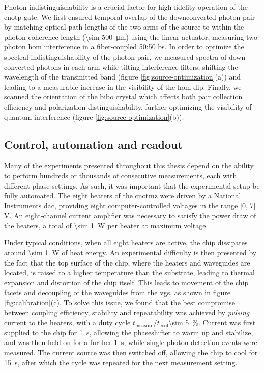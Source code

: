 Photon indistinguishability is a crucial factor for high-fidelity operation of the \gls{cnotp} gate. We first ensured temporal overlap of the downconverted photon pair by matching optical path lengths of the two arms of the source to within the photon coherence length (\SI{\sim 500}{\micro\metre}) using the linear actuator, measuring two-photon \gls{hom} interference in a fiber-coupled 50:50 \gls{bs}.  In order to optimize the spectral indistinguishability of the photon pair, we measured spectra of down-converted photons in each arm while tilting interference filters, shifting the wavelength of the transmitted band (figure \ref{fig:source-optimization}(a)) and leading to a measurable increase in the visibility of the \gls{hom} dip. Finally, we scanned the orientation of the \gls{bibo} crystal which affects both pair collection efficiency and polarization distinguishability, further optimizing the visibility of quantum interference (figure \ref{fig:source-optimization}(b)).

\subsection{Control, automation and readout} 
\label{sec:control-automation-readout}
Many of the experiments presented throughout this thesis depend on the ability to perform hundreds or thousands of consecutive measurements, each with different phase settings. As such, it was important that the experimental setup be fully automated.  The eight heaters of the \gls{cnotmz} were driven by a National Instruments \gls{dac}, providing eight computer-controlled voltages in the range [0, 7] \si{\volt}. An eight-channel current amplifier was necessary to satisfy the power draw of the heaters, a total of  \SI{\sim 1}{\watt} per heater at maximum voltage.

Under typical conditions, when all eight heaters are active, the chip dissipates around \SI{\sim 1}{\watt} of heat energy. An experimental difficulty is then presented by the fact that the top surface of the chip, where the heaters and waveguides are located, is raised to a higher temperature than the substrate, leading to thermal expansion and distortion of the chip itself. This leads to movement of the chip facets and decoupling of the waveguides from the \glspl{vg}, as shown in figure \ref{fig:calibration}(c). To solve this issue, we found that the best compromise between coupling efficiency, stability and repeatability was achieved by \emph{pulsing} current to the heaters, with a duty cycle $t_\mathrm{measure}/t_\mathrm{cool}$\SI{\sim 5}{\percent}. Current was first supplied to the chip for \SI{1}{\second}, allowing the phaseshifter to warm up and stabilize, and was then held on for a further \SI{1}{\second}, while single-photon detection events were measured. The current source was then switched off, allowing the chip to cool for \SI{15}{\second}, after which the cycle was repeated for the next measurement setting.  

